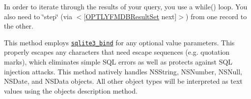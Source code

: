 In order to iterate through the results of your query, you use a {\ttfamily while()} loop. You also need to \char`\"{}step\char`\"{} (via {\ttfamily $<$\mbox{[}\mbox{\hyperlink{interface_o_p_t_l_y_f_m_d_b_result_set}{O\+P\+T\+L\+Y\+F\+M\+D\+B\+Result\+Set}} next\mbox{]}$>$}) from one record to the other.

This method employs \href{http://sqlite.org/c3ref/bind_blob.html}{\tt {\ttfamily sqlite3\+\_\+bind}} for any optional value parameters. This properly escapes any characters that need escape sequences (e.\+g. quotation marks), which eliminates simple S\+QL errors as well as protects against S\+QL injection attacks. This method natively handles {\ttfamily N\+S\+String}, {\ttfamily N\+S\+Number}, {\ttfamily N\+S\+Null}, {\ttfamily N\+S\+Date}, and {\ttfamily N\+S\+Data} objects. All other object types will be interpreted as text values using the object\textquotesingle{}s {\ttfamily description} method.


